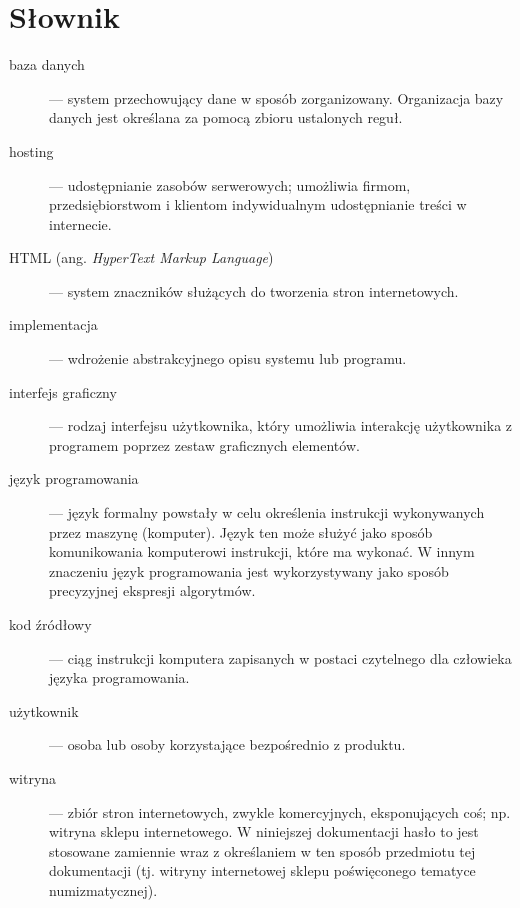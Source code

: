 \documentclass [11pt, a4paper, leqno]	{article}	%
\begin{document}
\section{Słownik}
\begin{description}

\item[baza danych] --- system przechowujący dane w sposób zorganizowany. Organizacja bazy danych jest określana za pomocą zbioru ustalonych reguł. 

\item[hosting] --- udostępnianie zasobów serwerowych; umożliwia firmom, przedsiębiorstwom i klientom indywidualnym udostępnianie treści w internecie.

\item[HTML (\textnormal{ang.} \textit{HyperText Markup Language})] ---  system znaczników służących do tworzenia stron internetowych.

\item[implementacja] --- wdrożenie abstrakcyjnego opisu systemu lub programu.

\item[interfejs graficzny] --- rodzaj interfejsu użytkownika, który umożliwia interakcję użytkownika z programem poprzez zestaw graficznych elementów.

\item[język programowania] --- język formalny powstały w celu określenia instrukcji wykonywanych przez maszynę (komputer). 
Język ten może służyć jako sposób komunikowania komputerowi instrukcji, które ma wykonać. W innym znaczeniu język programowania jest wykorzystywany jako sposób precyzyjnej ekspresji algorytmów.

\item[kod źródłowy] --- ciąg instrukcji komputera zapisanych w postaci czytelnego dla człowieka języka programowania. 

\item[użytkownik] --- osoba lub osoby korzystające bezpośrednio z produktu.

\item[witryna] --- zbiór stron internetowych, zwykle komercyjnych, eksponujących coś; np. witryna sklepu internetowego. W niniejszej dokumentacji hasło to jest stosowane zamiennie wraz z określaniem w ten sposób przedmiotu tej dokumentacji (tj. witryny internetowej sklepu poświęconego tematyce numizmatycznej).


\end{description}
\end{document}

